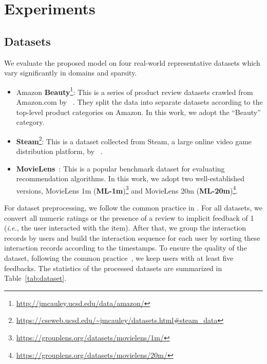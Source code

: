 \section{Experiments}

\subsection{Datasets}

We evaluate the proposed model on four real-world representative  datasets which vary significantly in domains and sparsity.

\begin{itemize}
    \item Amazon \textbf{Beauty}\footnote{\url{http://jmcauley.ucsd.edu/data/amazon/}}: This is a series of product review datasets crawled from Amazon.com by \citeauthor{McAuley:sigir2015}~\cite{McAuley:sigir2015}. 
    They split the data into separate datasets according to the top-level product categories on Amazon. In this work, we adopt the ``Beauty'' category.
    \item \textbf{Steam}\footnote{\url{https://cseweb.ucsd.edu/~jmcauley/datasets.html\#steam_data}}: 
    This is a dataset collected from Steam, a large online video game distribution platform, by \citeauthor{Kang:ICDM2018:SAS}~\cite{Kang:ICDM2018:SAS}.
    \item \textbf{MovieLens}~\cite{Harper:2015:MDH}: This is a popular benchmark dataset for evaluating recommendation algorithms. In this work, we adopt two well-established versions, MovieLens 1m (\textbf{ML-1m})\footnote{\url{https://grouplens.org/datasets/movielens/1m/}} and MovieLens 20m (\textbf{ML-20m})\footnote{\url{https://grouplens.org/datasets/movielens/20m/}}.
\end{itemize}

For dataset preprocessing, we follow the common practice in \cite{Rendle:WWW2010:FPM,Tang:WSDM2018:caser,Kang:ICDM2018:SAS}. For all datasets, we convert all numeric ratings or the presence of a review to implicit feedback of 1 (\textit{i.e.}, the user interacted with the item). After that, we group the interaction records by users and build the interaction sequence for each user by sorting these interaction records according to the timestamps. To ensure the quality of the dataset, following the common practice~\cite{Rendle:WWW2010:FPM,He:www2017:NCF,Tang:WSDM2018:caser,Kang:ICDM2018:SAS}, we keep users with at least five feedbacks. The statistics of the processed datasets are summarized in Table~\ref{tab:dataset}.

